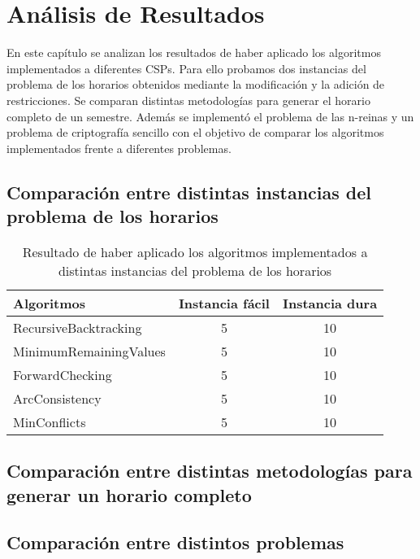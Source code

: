 \chapter{An\'alisis de Resultados}

En este cap\'itulo se analizan los resultados de haber aplicado los algoritmos implementados a diferentes CSPs. Para ello probamos dos instancias del problema de los horarios obtenidos mediante la modificaci\'on y la adici\'on de restricciones. Se comparan distintas metodolog\'ias para generar el horario completo de un semestre. Adem\'as se implement\'o el problema de las n-reinas y un problema de criptograf\'ia sencillo con el objetivo de comparar los algoritmos implementados frente a diferentes problemas.

\section{Comparaci\'on entre distintas instancias del problema de los horarios}

\begin{table}[h]
	\caption{Resultado de haber aplicado los algoritmos implementados a distintas instancias del problema de los horarios}
	\begin{center}
		\label{1semana}
		\begin{tabular}{lcc}
			Algoritmos & Instancia f\'acil & Instancia dura \\ \hline
			RecursiveBacktracking & 5 & 10 \\
			MinimumRemainingValues & 5 & 10 \\
			ForwardChecking & 5 & 10 \\
			ArcConsistency & 5 & 10 \\
			MinConflicts & 5 & 10
		\end{tabular}
	\end{center}
\end{table}

\section{Comparaci\'on entre distintas metodolog\'ias para generar un horario completo}

\section{Comparaci\'on entre distintos problemas}